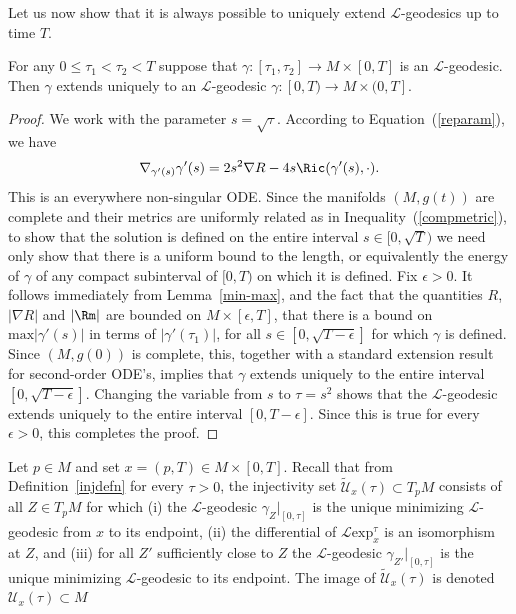 Let us now show that it is always possible to uniquely extend
${\mathcal L}$-geodesics up to time $T$.

\begin{lemma}
\label{lem:l-geodesic-extension}
 For any $0\le \tau_1<\tau_2<T$ suppose that
 $\gamma\colon [\tau_1,\tau_2]\to M\times [0,T]$ is an ${\mathcal L}$-geodesic.
 Then $\gamma$ extends uniquely to an ${\mathcal L}$-geodesic
$\gamma\colon [0,T)\to M\times (0,T]$.
\end{lemma}


\begin{proof}\sketch
We work with the parameter $s=\sqrt{\tau}$. According to
Equation~(\ref{reparam}), we have
$$\nabla_{\gamma'(s)}\gamma'(s)=2s^2\nabla
R-4s\Ric(\gamma'(s),\cdot).$$ This is an everywhere
non-singular ODE. Since the manifolds $(M,g(t))$ are complete and
their metrics are uniformly related as in
Inequality~(\ref{compmetric}), to show that the solution is defined
on the entire interval $s\in [0,\sqrt{T})$ we need only show that
there is a uniform bound to the length, or equivalently the energy
of $\gamma$ of any compact subinterval of $[0,T)$ on which it is
defined. Fix $\epsilon>0$. It follows immediately from
Lemma~\ref{min-max}, and the fact that the quantities $R$, $|\nabla
R|$ and $|\Rm|$ are bounded on $M\times [\epsilon,T]$, that
there is a bound on $\mathrm{max}|\gamma'(s)|$ in terms of
$|\gamma'(\tau_1)|$, for all $s\in [0,\sqrt{T-\epsilon}]$ for which
$\gamma$ is defined. Since $(M,g(0))$ is complete, this, together
with a standard extension result for second-order ODE's, implies
that $\gamma$ extends uniquely to the entire interval
$[0,\sqrt{T-\epsilon}]$. Changing the variable from $s$ to
$\tau=s^2$ shows that the ${\mathcal L}$-geodesic extends uniquely
to the entire interval $[0,T-\epsilon]$. Since this is true for
every $\epsilon>0$, this completes the proof.
\end{proof}

Let $p\in M$ and set $x=(p,T)\in M\times [0,T]$. Recall that from
Definition~\ref{injdefn} for every $\tau>0$, the injectivity set
$\widetilde{\mathcal U}_{x}(\tau)\subset T_pM$ consists of all $Z\in
T_pM$ for which (i) the ${\mathcal L}$-geodesic
$\gamma_Z|_{[0,\tau]}$ is the unique minimizing ${\mathcal
L}$-geodesic from $x$ to its endpoint, (ii) the differential of
${\mathcal L}\mathrm{exp}_{x}^\tau$ is an isomorphism at $Z$, and (iii)
for all  $Z'$ sufficiently close to
 $Z$ the ${\mathcal L}$-geodesic $\gamma_{Z'}|_{[0,\tau]}$ is the unique minimizing
 ${\mathcal L}$-geodesic to its endpoint. The image
of $\widetilde{\mathcal U}_{x}(\tau)$ is denoted ${\mathcal U}_{x}(\tau)\subset
M$




